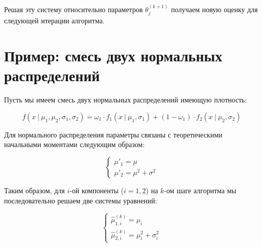 \documentclass[14pt, a4paper, oneside]{memoir}
\begin{document}
Решая эту систему относительно параметров $\theta_j^{(k+1)}$ получаем новую оценку для следующей итерации алгоритма.


\section{Пример: смесь двух нормальных распределений}

Пусть мы имеем смесь двух нормальных распределений имеющую плотность:

\[f(x ~|~ \mu_1, \mu_2, \sigma_1, \sigma_2) = \omega_1 \cdot f_1(x~|~ \mu_1, \sigma_1) + (1 - \omega_1) \cdot f_2(x~|~ \mu_2, \sigma_2)\]

Для нормального распределения параметры связаны с теоретическими начальными моментами следующим образом:

\[\begin{cases} \mu'_1 = \mu \\  \mu'_2 = \mu^2 + \sigma^2 \end{cases}\]


Таким образом, для $i$-ой компоненты ($i = 1,2$) на $k$-ом шаге алгоритма мы последовательно решаем две системы уравнений:

\[\begin{cases} \hat{\mu}^{(k)}_{1, i} = \mu_i \\  \hat{\mu}^{(k)}_{2, i} = \mu_i^2 + \sigma_i^2 \end{cases}\]
\end{document}
